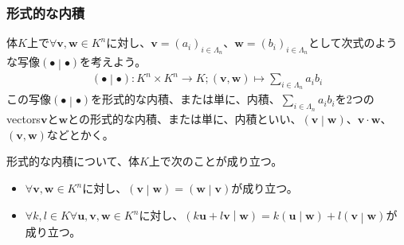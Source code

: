 \documentclass[dvipdfmx]{jsarticle}
\begin{document}
\subsubsection{形式的な内積}%
\begin{dfn}
体$K$上で$\forall\mathbf{v},\mathbf{w} \in K^{n}$に対し、$\mathbf{v} = \left( a_{i} \right)_{i \in \varLambda_{n}}$、$\mathbf{w} = \left( b_{i} \right)_{i \in \varLambda_{n}}$として次式のような写像$\left( \bullet \middle| \bullet \right)$を考えよう。
\begin{align*}
\left( \bullet \middle| \bullet \right):K^{n} \times K^{n} \rightarrow K;\left( \mathbf{v},\mathbf{w} \right) \mapsto \sum_{i \in \varLambda_{n}} {a_{i}b_{i}}
\end{align*}
この写像$\left( \bullet \middle| \bullet \right)$を形式的な内積、または単に、内積、$\sum_{i \in \varLambda_{n}} {a_{i}b_{i}}$を2つのvectors$\mathbf{v}$と$\mathbf{w}$との形式的な内積、または単に、内積といい、$\left( \mathbf{v} \middle| \mathbf{w} \right)$、$\mathbf{v} \cdot \mathbf{w}$、$\left( \mathbf{v},\mathbf{w} \right)$などとかく。
\end{dfn}
\begin{thm}\label{2.1.4.4}
形式的な内積について、体$K$上で次のことが成り立つ。
\begin{itemize}
\item
  $\forall\mathbf{v},\mathbf{w} \in K^{n}$に対し、$\left( \mathbf{v} \middle| \mathbf{w} \right) = \left( \mathbf{w} \middle| \mathbf{v} \right)$が成り立つ。
\item
  $\forall k,l \in K\forall\mathbf{u,v,w} \in K^{n}$に対し、$\left( k\mathbf{u} + l\mathbf{v} \middle| \mathbf{w} \right) = k\left( \mathbf{u} \middle| \mathbf{w} \right) + l\left( \mathbf{v} \middle| \mathbf{w} \right)$が成り立つ。
\end{itemize}
\end{thm}
\end{document}
